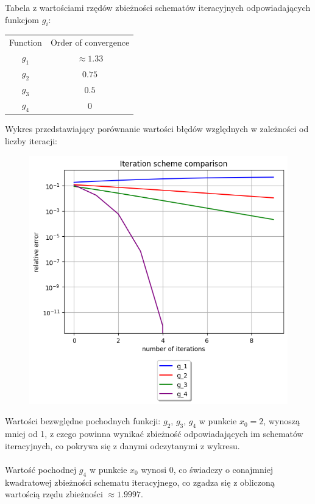\documentclass{article}
\begin{document}
Tabela z wartościami rzędów zbieżności schematów iteracyjnych 
odpowiadających funkcjom $g_i$:
\begin{center}
  \begin{tabular}{c c} 
   Function & Order of convergence\\
   $g_1$ & $\approx 1.33$\\
   $g_2$ & $0.75$\\
   $g_3$ & $0.5$\\
   $g_4$ & $0$
  \end{tabular}
\end{center}
Wykres przedstawiający porównanie wartości błędów względnych w zależności od liczby
iteracji:
\begin{figure}[H]
  \includegraphics[width=\linewidth]{figures/iteration.png}
\end{figure}

Wartości bezwględne pochodnych funkcji: $g_2$, $g_3$, $g_4$ w punkcie $x_0=2$, wynoszą mniej od 1, z czego
powinna wynikać zbieżność odpowiadających im schematów iteracyjnych,
co pokrywa się z danymi odczytanymi z wykresu. \\\\
\null\quad
Wartość pochodnej $g_4$ w punkcie $x_0$ wynosi 0, co świadczy o conajmniej kwadratowej zbieżności
schematu iteracyjnego, co zgadza się z obliczoną wartością rzędu zbieżności $\approx 1.9997$.
\end{document}
